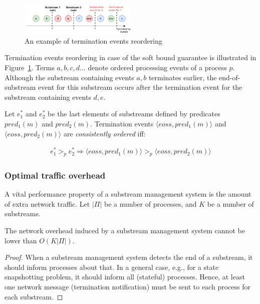 \begin{figure}[htbp]
  \centering
  \includegraphics[width=0.50\textwidth]{pics/notifications-reordering.pdf}
  \caption{An example of termination events reordering}
  \label{notifications_reordering}
\end{figure}

Termination events reordering in case of the soft bound guarantee is illustrated in Figure~\ref{notifications_reordering}. Terms $a,b,c,d...$ denote ordered processing events of a process $p$. Although the substream containing events $a,b$ terminates earlier, the end-of-substream event for this substream occurs after the termination event for the substream containing events $d,e$. 

Let $e^{*}_1$ and $e^{*}_2$ be the last elements of substreams defined by predicates $pred_1(m)$ and $pred_2(m)$. Termination events $\langle eoss, pred_1(m)\rangle$ and $\langle eoss, pred_2(m)\rangle$ are {\em consistently ordered} iff:

\begin{align*}
e^{*}_1 >_p e^{*}_2 \Longrightarrow \langle eoss, pred_1(m)\rangle >_p \langle eoss, pred_2(m)\rangle
\end{align*}

\subsubsection{Optimal traffic overhead}

A vital performance property of a substream management system is the amount of extra network traffic. Let $|\Pi|$ be a number of processes, and $K$ be a number of substreams. 

\begin{lemma}
The network overhead induced by a substream management system cannot be lower than $O(K|\Pi|)$. 
\end{lemma}
\begin{proof}
When a substream management system detects the end of a substream, it should inform processes about that. In a general case, e.g., for a state snapshotting problem, it should inform all (stateful) processes. Hence, at least one network message (termination notification) must be sent to each process for each substream.
\end{proof}

